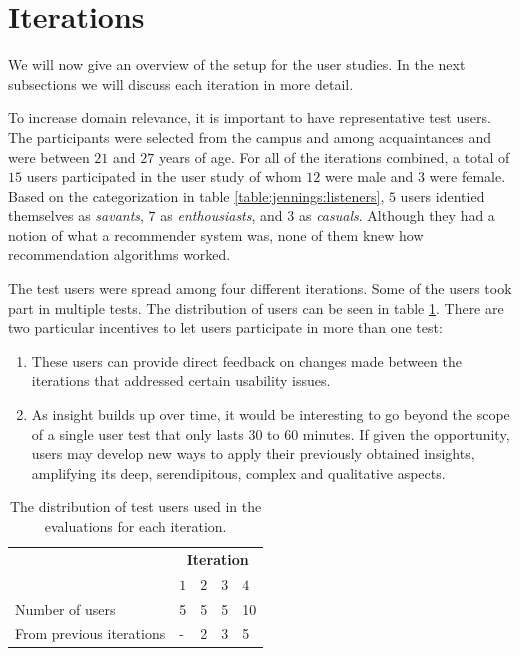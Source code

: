\section{Iterations}

We will now give an overview of the setup for the user studies. In the next subsections we will discuss each iteration in more detail.

To increase domain relevance, it is important to have representative test users. The participants were selected from the campus and among acquaintances and were between $21$ and $27$ years of age. For all of the iterations combined, a total of $15$ users participated in the user study of whom $12$ were male and $3$ were female. Based on the categorization in table \ref{table:jennings:listeners}, $5$ users identied themselves as \emph{savants}, $7$ as \emph{enthousiasts}, and $3$ as \emph{casuals}. Although they had a notion of what a recommender system was, none of them knew how recommendation algorithms worked.

The test users were spread among four different iterations. Some of the users took part in multiple tests. The distribution of users can be seen in table \ref{table:evaluation:users}. There are two particular incentives to let users participate in more than one test:

\begin{enumerate}
	\item These users can provide direct feedback on changes made between the iterations that addressed certain usability issues.
	\item As insight builds up over time, it would be interesting to go beyond the scope of a single user test that only lasts $30$ to $60$ minutes. If given the opportunity, users may develop new ways to apply their previously obtained insights, amplifying its deep, serendipitous, complex and qualitative aspects.
\end{enumerate}

\begin{table}
	\caption{The distribution of test users used in the evaluations for each iteration.}
	\begin{center}
		\begin{tabular}{l | l l l l }
				\hline
																	& \multicolumn{4}{c}{\textbf{Iteration}} \\
																\cline{2-5}
																& $1$ & $2$ & $3$ & $4$ \\
			\hline
			Number of users						&	5 	&	5		&	5		&	10	\\
			From previous iterations	&	-  	&	2 	&	3		&	5	\\
			\hline
		\end{tabular}
	\end{center}
	\label{table:evaluation:users}
\end{table}

